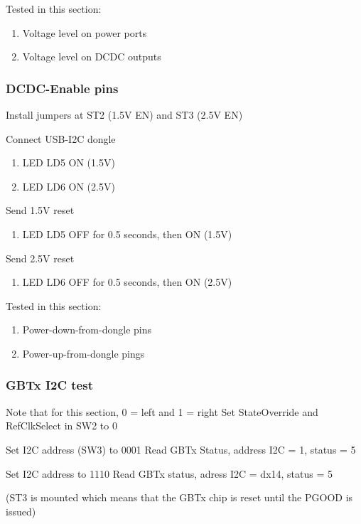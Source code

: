 Tested in this section:
\begin{enumerate}
    \item Voltage level on power ports
    \item Voltage level on DCDC outputs
\end{enumerate}

\subsubsection{DCDC-Enable pins}

Install jumpers at ST2 (1.5V EN) and ST3 (2.5V EN)

Connect USB-I2C dongle

\begin{enumerate}
    \item LED LD5 ON (1.5V)
    \item LED LD6 ON (2.5V)
\end{enumerate}

Send 1.5V reset
\begin{enumerate}
    \item LED LD5 OFF for 0.5 seconds, then ON (1.5V)
\end{enumerate}

Send 2.5V reset
\begin{enumerate}
    \item LED LD6 OFF for 0.5 seconds, then ON (2.5V)
\end{enumerate}

Tested in this section:
\begin{enumerate}
    \item Power-down-from-dongle pins
    \item Power-up-from-dongle pings
\end{enumerate}


\subsubsection{GBTx I2C test}

Note that for this section, 0 = left and 1 = right
Set StateOverride and RefClkSelect in SW2 to 0

Set I2C address (SW3) to 0001
Read GBTx Status, address I2C = 1, status = 5

Set I2C address to 1110
Read GBTx status, adress I2C = dx14, status = 5

(ST3 is mounted which means that the GBTx chip is reset until the PGOOD is issued)

